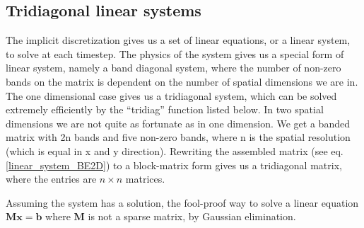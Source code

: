 \subsection{Tridiagonal linear systems}
The implicit discretization gives us a set of linear equations, or a linear system, to solve at each timestep. 
The physics of the system gives us a special form of linear system, namely a band diagonal system, where the number of non-zero bands on the matrix is dependent on the number of spatial dimensions we are in. 
The one dimensional case gives us a tridiagonal system, which can be solved extremely efficiently by the ``tridiag'' function listed below.
In two spatial dimensions we are not quite as fortunate as in one dimension. We get a banded matrix with 2n bands and five non-zero bands, where n is the spatial resolution (which is equal in x and y direction). 
Rewriting the assembled matrix (see eq. \ref{linear_system_BE2D}) to a block-matrix form gives us a tridiagonal matrix, where the entries are $n\times n$ matrices. 


Assuming the system has a solution, the fool-proof way to solve a linear equation $\mathbf{M}\mathbf{x} = \mathbf{b}$ where $\mathbf{M}$ is not a sparse matrix, by Gaussian elimination.

